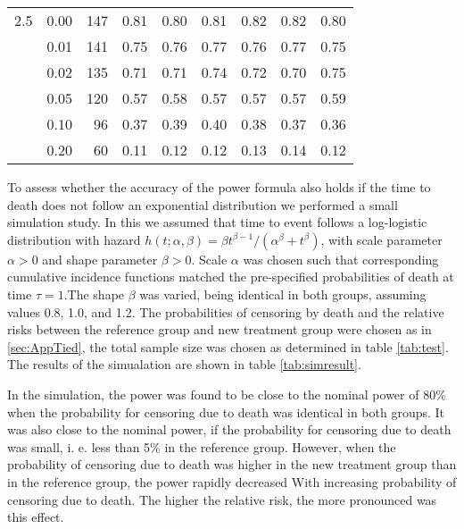 \documentclass[bimj,fleqn]{w-art}\usepackage[]{graphicx}\usepackage[]{color}
\theoremstyle{plain}
\theoremstyle{definition}
\begin{document}
\begin{table}[ht]
\begin{tabular}{lrrrrrrrr}
  2.5 & 0.00 & 147 & 0.81 & 0.80 & 0.81 & 0.82 & 0.82 & 0.80 \\ 
    & 0.01 & 141 & 0.75 & 0.76 & 0.77 & 0.76 & 0.77 & 0.75 \\ 
    & 0.02 & 135 & 0.71 & 0.71 & 0.74 & 0.72 & 0.70 & 0.75 \\ 
    & 0.05 & 120 & 0.57 & 0.58 & 0.57 & 0.57 & 0.57 & 0.59 \\ 
    & 0.10 & 96 & 0.37 & 0.39 & 0.40 & 0.38 & 0.37 & 0.36 \\ 
    & 0.20 & 60 & 0.11 & 0.12 & 0.12 & 0.13 & 0.14 & 0.12 \\ 
   \hline
\end{tabular}
\end{table}



To assess whether the accuracy of the power formula also holds if the time to
death does not follow an exponential distribution we performed a small simulation
study. In this we assumed that time to event follows a log-logistic distribution
with hazard $h(t; \alpha, \beta) = \beta t^{\beta - 1} / (\alpha^{\beta} + t^{\beta})$,
with scale parameter $\alpha > 0 $ and shape parameter $\beta > 0$. Scale $\alpha$ was
chosen such that corresponding cumulative incidence functions matched the
pre-specified probabilities of death at time $\tau = 1$.The shape $\beta$ was
varied, being identical in both groups, assuming values 0.8, 1.0, and 1.2.
The probabilities of censoring by death and the relative risks between the
reference group and new treatment group were chosen as in \ref{sec:AppTied}, the
total sample size was chosen as determined in table \ref{tab:test}. The results
of the simualation are shown in table \ref{tab:simresult}.

In the simulation, the power was found to be close to the nominal power of 80\%
when the probability for censoring due to death was identical in both groups.
It was also close to the nominal power, if the probability for censoring due to
death was small, i. e. less than 5\% in the reference group. However, when the
probability of censoring due to death was higher in the new treatment group than
in the reference group, the power rapidly decreased With increasing probability
of censoring due to death. The higher the relative risk, the more pronounced was
this effect.
\end{document}
